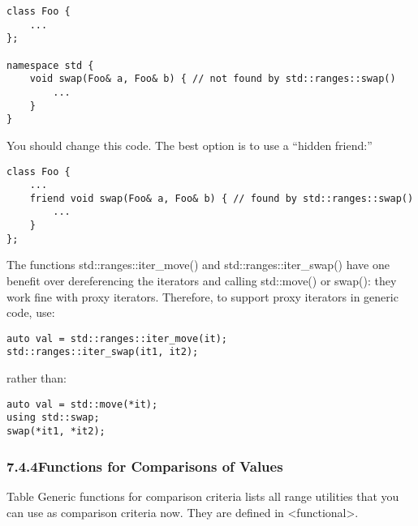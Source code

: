 \begin{lstlisting}[style=styleCXX]
class Foo {
	...
};

namespace std {
	void swap(Foo& a, Foo& b) { // not found by std::ranges::swap()
		...
	}
}
\end{lstlisting}

You should change this code. The best option is to use a “hidden friend:”

\begin{lstlisting}[style=styleCXX]
class Foo {
	...
	friend void swap(Foo& a, Foo& b) { // found by std::ranges::swap()
		...
	}
};
\end{lstlisting}

The functions std::ranges::iter\_move() and std::ranges::iter\_swap() have one benefit over dereferencing the iterators and calling std::move() or swap(): they work fine with proxy iterators. Therefore, to support proxy iterators in generic code, use:

\begin{lstlisting}[style=styleCXX]
auto val = std::ranges::iter_move(it);
std::ranges::iter_swap(it1, it2);
\end{lstlisting}

rather than:

\begin{lstlisting}[style=styleCXX]
auto val = std::move(*it);
using std::swap;
swap(*it1, *it2);
\end{lstlisting}

\subsubsection*{ 7.4.4\hspace{0.2cm}Functions for Comparisons of Values}

Table Generic functions for comparison criteria lists all range utilities that you can use as comparison criteria now. They are defined in <functional>.


